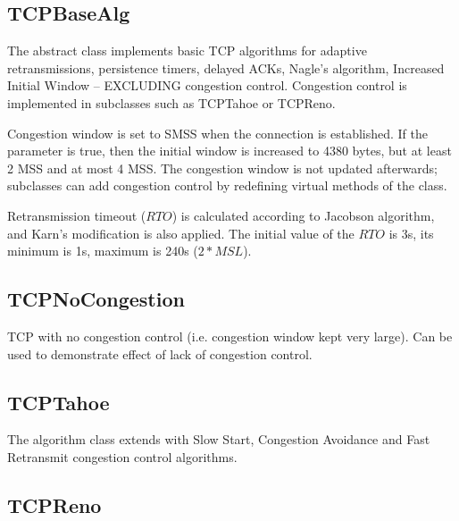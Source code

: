 \subsection{TCPBaseAlg}

The abstract  class implements basic TCP
algorithms for adaptive retransmissions, persistence timers,
delayed ACKs, Nagle's algorithm, Increased Initial Window
-- EXCLUDING congestion control. Congestion control
is implemented in subclasses such as TCPTahoe or TCPReno.

Congestion window is set to SMSS when the connection is established.
If the  parameter is true, then the initial
window is increased to 4380 bytes, but at least 2 MSS and at most 4 MSS.
The congestion window is not updated afterwards; subclasses can
add congestion control by redefining virtual methods of the
 class.

Retransmission timeout ($RTO$) is calculated according to
Jacobson algorithm, and Karn's modification is also applied.
The initial value of the $RTO$ is 3s, its minimum is 1s,
maximum is 240s ($2*MSL$).


\subsection{TCPNoCongestion}

TCP with no congestion control (i.e. congestion window kept very large).
Can be used to demonstrate effect of lack of congestion control.


\subsection{TCPTahoe}

The  algorithm class extends 
with Slow Start, Congestion Avoidance and Fast Retransmit congestion
control algorithms.

\subsection{TCPReno}

